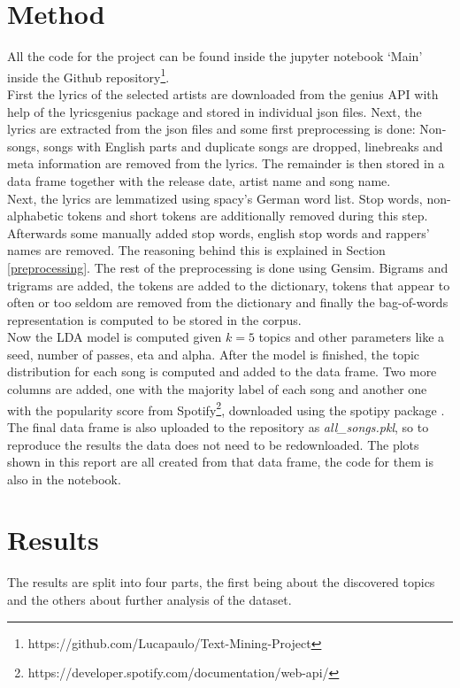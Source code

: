 \documentclass[conference]{IEEEtran}
\begin{document}
\section{Method}
All the code for the project can be found inside the jupyter notebook {\lq}Main{\rq} inside the Github repository\footnote{https://github.com/Lucapaulo/Text-Mining-Project}.\\
First the lyrics of the selected artists are downloaded from the genius API with help of the lyricsgenius package \cite{lyricsgenius} and stored in individual json files. Next, the lyrics are extracted from the json files and some first preprocessing is done: Non-songs, songs with English parts and duplicate songs are dropped, linebreaks and meta information are removed from the lyrics. The remainder is then stored in a data frame together with the release date, artist name and song name.\\
Next, the lyrics are lemmatized using spacy's German word list. Stop words, non-alphabetic tokens and short tokens are additionally removed during this step. Afterwards some manually added stop words, english stop words and rappers' names are removed. The reasoning behind this is explained in Section \ref{preprocessing}. The rest of the preprocessing is done using Gensim. Bigrams and trigrams are added, the tokens are added to the dictionary, tokens that appear to often or too seldom are removed from the dictionary and finally the bag-of-words representation is computed to be stored in the corpus.\\
Now the LDA model is computed given $k=5$ topics and other parameters like a seed, number of passes, eta and alpha. After the model is finished, the topic distribution for each song is computed and added to the data frame. Two more columns are added, one with the majority label of each song and another one with the popularity score from Spotify\footnote{https://developer.spotify.com/documentation/web-api/}, downloaded using the spotipy package \cite{spotipy}. The final data frame is also uploaded to the repository as \textit{all\_songs.pkl}, so to reproduce the results the data does not need to be redownloaded. The plots shown in this report are all created from that data frame, the code for them is also in the notebook.

\section{Results} \label{results}
The results are split into four parts, the first being about the discovered topics and the others about further analysis of the dataset.
\end{document}
